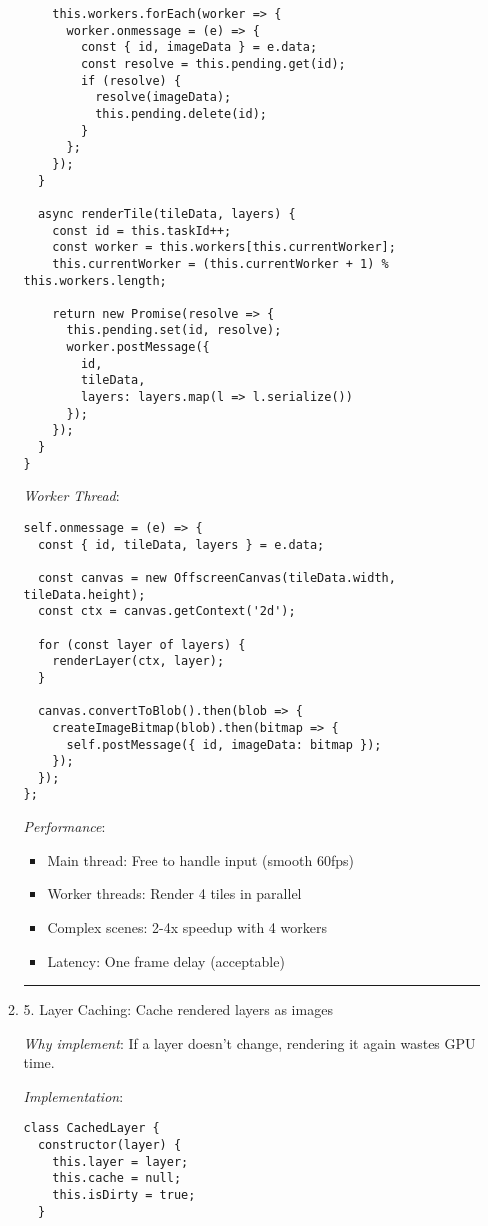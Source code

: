 \documentclass[11pt]{article}
\begin{document}
\begin{enumerate}
\begin{enumerate}
\begin{verbatim}
    this.workers.forEach(worker => {
      worker.onmessage = (e) => {
        const { id, imageData } = e.data;
        const resolve = this.pending.get(id);
        if (resolve) {
          resolve(imageData);
          this.pending.delete(id);
        }
      };
    });
  }
  
  async renderTile(tileData, layers) {
    const id = this.taskId++;
    const worker = this.workers[this.currentWorker];
    this.currentWorker = (this.currentWorker + 1) % this.workers.length;
    
    return new Promise(resolve => {
      this.pending.set(id, resolve);
      worker.postMessage({
        id,
        tileData,
        layers: layers.map(l => l.serialize())
      });
    });
  }
}
\end{verbatim}

\emph{Worker Thread}:
\begin{verbatim}
self.onmessage = (e) => {
  const { id, tileData, layers } = e.data;
  
  const canvas = new OffscreenCanvas(tileData.width, tileData.height);
  const ctx = canvas.getContext('2d');
  
  for (const layer of layers) {
    renderLayer(ctx, layer);
  }
  
  canvas.convertToBlob().then(blob => {
    createImageBitmap(blob).then(bitmap => {
      self.postMessage({ id, imageData: bitmap });
    });
  });
};
\end{verbatim}

\emph{Performance}:
\begin{itemize}
\item Main thread: Free to handle input (smooth 60fps)
\item Worker threads: Render 4 tiles in parallel
\item Complex scenes: 2-4x speedup with 4 workers
\item Latency: One frame delay (acceptable)
\end{itemize}

\noindent\rule{\textwidth}{0.5pt}
\item 5. Layer Caching: Cache rendered layers as images
\label{sec:orga003cd6}

\emph{Why implement}: If a layer doesn't change, rendering it again wastes GPU time.

\emph{Implementation}:
\begin{verbatim}
class CachedLayer {
  constructor(layer) {
    this.layer = layer;
    this.cache = null;
    this.isDirty = true;
  }
  

\end{verbatim}
\end{enumerate}
\end{enumerate}
\end{document}
